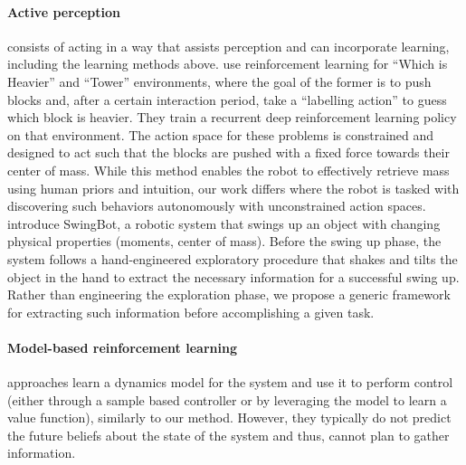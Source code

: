 \documentclass[anon]{l4dc2024}
\begin{document}
\paragraph{Active perception}
\citep{activeperception} consists of acting in a way that assists perception and can incorporate learning, including the learning methods above.
\citet{denil2016learning} use reinforcement learning for ``Which is Heavier'' and ``Tower'' environments, where the goal of the former is to push blocks and, after a certain interaction period, take a ``labelling action'' to guess which block is heavier.
They train a recurrent deep reinforcement learning policy on that environment.
The action space for these problems is constrained and designed to act such that the blocks are pushed with a fixed force towards their center of mass. While this method enables the robot to effectively retrieve mass using human priors and intuition, our work differs where the robot is tasked with discovering such behaviors autonomously with unconstrained action spaces.%
\citet{swingbot} introduce SwingBot, a robotic system that swings up an object with changing physical properties (moments, center of mass).
Before the swing up phase, the system follows a hand-engineered exploratory procedure that shakes and tilts the object in the hand to extract the necessary information for a successful swing up. Rather than engineering the exploration phase, we propose a generic framework for extracting such information before accomplishing a given task.

\paragraph{Model-based reinforcement learning}
approaches \citep{dyna, planet, pilco} learn a dynamics model for the system and use it to perform control (either through a sample based controller or by leveraging the model to learn a value function), similarly to our method.
However, they typically do not predict the future beliefs about the state of the system and thus, cannot plan to gather information.
\end{document}

